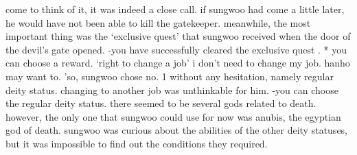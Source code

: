  come to think of it, it was indeed a close call.
 if sungwoo had come a little later, he would have not been able to kill the gatekeeper.
meanwhile, the most important thing was the ‘exclusive quest’ that sungwoo received when the door of the devil’s gate opened.
-you have successfully cleared the exclusive quest .
* you can choose a reward.
‘right to change a job’ i don’t need to change my job.
 hanho may want to.
’so, sungwoo chose no.
 1 without any hesitation, namely regular deity status.
 changing to another job was unthinkable for him.
-you can choose the regular deity status.
there seemed to be several gods related to death.
 however, the only one that sungwoo could use for now was anubis, the egyptian god of death.
sungwoo was curious about the abilities of the other deity statuses, but it was impossible to find out the conditions they required.

